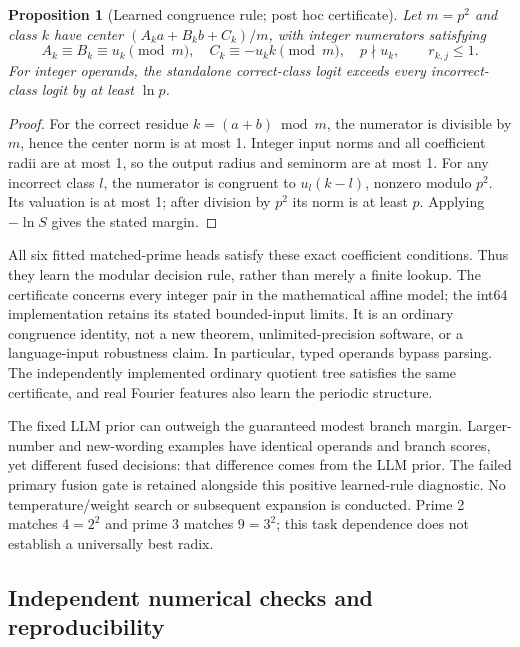 \documentclass[11pt]{article}
\newtheorem{proposition}{Proposition}
\begin{document}
\begin{samepage}
\begin{proposition}[Learned congruence rule; post hoc certificate]
Let \(m=p^2\) and class \(k\) have center
\((A_ka+B_kb+C_k)/m\), with integer numerators satisfying
\begin{equation}
 A_k\equiv B_k\equiv u_k\pmod m,\quad
 C_k\equiv-u_kk\pmod m,\quad p\nmid u_k,
 \qquad r_{k,j}\leq1.
\end{equation}
For integer operands, the standalone correct-class logit exceeds every
incorrect-class logit by at least \(\ln p\).
\end{proposition}
\begin{proof}
For the correct residue \(k=(a+b)\bmod m\), the numerator is divisible
by \(m\), hence the center norm is at most 1. Integer input norms and all
coefficient radii are at most 1, so the output radius and seminorm are
at most 1. For any incorrect class \(l\), the numerator is congruent to
\(u_l(k-l)\), nonzero modulo \(p^2\). Its valuation is at most 1;
after division by \(p^2\) its norm is at least \(p\). Applying \(-\ln S\)
gives the stated margin.
\end{proof}
\end{samepage}

All six fitted matched-prime heads satisfy these exact coefficient conditions.
Thus they learn the modular decision rule, rather than merely a finite lookup.
The certificate concerns every integer pair in the mathematical affine model;
the int64 implementation retains its stated bounded-input limits. It is an
ordinary congruence identity, not a new theorem, unlimited-precision software,
or a language-input robustness claim. In particular, typed operands bypass
parsing. The independently implemented ordinary quotient tree satisfies the
same certificate, and real Fourier features also learn the periodic structure.

The fixed LLM prior can outweigh the guaranteed modest branch margin.
Larger-number and new-wording examples have identical operands and branch
scores, yet different fused decisions: that difference comes from the LLM
prior. The failed primary fusion gate is retained alongside this positive
learned-rule diagnostic. No temperature/weight search or subsequent expansion
is conducted. Prime 2 matches \(4=2^2\) and prime 3 matches \(9=3^2\);
this task dependence does not establish a universally best radix.

\subsection{Independent numerical checks and reproducibility}
\end{document}
